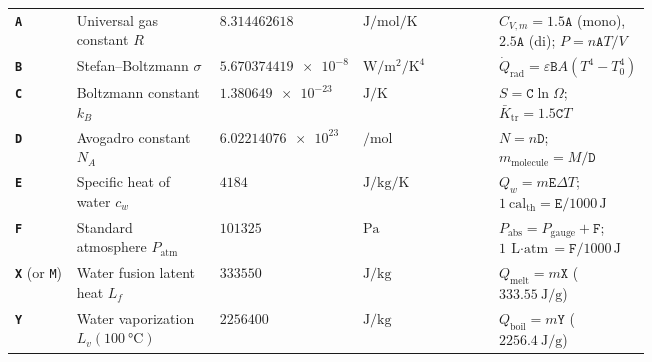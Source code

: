 \begin{table}[h!]
\centering
{}\label{tab:19:calc}
\footnotesize
\setlength{\tabcolsep}{3.5pt}
\renewcommand{\arraystretch}{1.15}
\begin{tabularx}{\linewidth}{@{}C{0.10\linewidth} >{\raggedright\arraybackslash}p{0.23\linewidth} R{0.19\linewidth} >{\raggedright\arraybackslash}p{0.22\linewidth} >{\raggedright\arraybackslash}X@{}}
\toprule
{} &  &  &  &  \\
\midrule
\textbf{\texttt{A}} & Universal gas constant $R$ & $\num{8.314462618}$ & $\si{\joule\per\mole\per\kelvin}$ & $C_{V,m} = 1.5\texttt{A}$ (mono), $2.5\texttt{A}$ (di); $P = n\texttt{A}T/V$ \\
\textbf{\texttt{B}} & Stefan--Boltzmann $\sigma$ & $\num{5.670374419e-8}$ & $\si{\watt\per\square\meter\per\kelvin\tothe{4}}$ & $\dot{Q}_{\mathrm{rad}} = \varepsilon\texttt{B}A(T^4 - T_0^4)$ \\
\textbf{\texttt{C}} & Boltzmann constant $k_B$ & $\num{1.380649e-23}$ & $\si{\joule\per\kelvin}$ & $S = \texttt{C}\ln\Omega$;\quad $\bar{K}_{\mathrm{tr}} = 1.5\texttt{C}T$ \\
\textbf{\texttt{D}} & Avogadro constant $N_A$ & $\num{6.02214076e23}$ & $\si{\per\mole}$ & $N = n\texttt{D}$;\quad $m_{\mathrm{molecule}} = M/\texttt{D}$ \\
\textbf{\texttt{E}} & Specific heat of water $c_w$ & $\num{4184}$ & $\si{\joule\per\kilogram\per\kelvin}$ & $Q_w = m\texttt{E}\Delta T$;\quad $\SI{1}{\text{cal}_{\mathrm{th}}} = \texttt{E}/1000\,\si{\joule}$ \\
\textbf{\texttt{F}} & Standard atmosphere $P_{\mathrm{atm}}$ & $\num{101325}$ & $\si{\pascal}$ & $P_{\mathrm{abs}} = P_{\mathrm{gauge}} + \texttt{F}$;\quad $\SI{1}{\liter\cdot\text{atm}} = \texttt{F}/1000\,\si{\joule}$ \\
\textbf{\texttt{X}} (or \texttt{M}) & Water fusion latent heat $L_f$ & $\num{333550}$ & $\si{\joule\per\kilogram}$ & $Q_{\mathrm{melt}} = m\texttt{X}$ ($\SI{333.55}{\joule\per\gram}$) \\
\textbf{\texttt{Y}} & Water vaporization $L_v(\SI{100}{\celsius})$ & $\num{2256400}$ & $\si{\joule\per\kilogram}$ & $Q_{\mathrm{boil}} = m\texttt{Y}$ ($\SI{2256.4}{\joule\per\gram}$) \\
\bottomrule
\end{tabularx}
\end{table}

